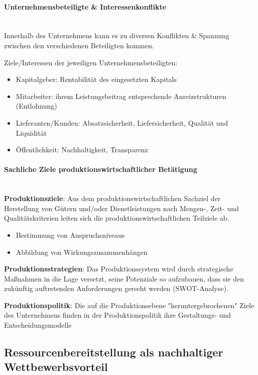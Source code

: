 \documentclass[11pt]{article}
\begin{document}
\paragraph{Unternehmensbeteiligte & Interessenkonflikte}\\
Innerhalb des Unternehmens kann es zu diversen Konflikten \& Spannung zwischen den verschiedenen Beteiligten kommen.

Ziele/Interessen der jeweiligen Unternehmensbeteiligten:
\begin{itemize}
\item Kapitalgeber: Rentabilität des eingesetzten Kapitals
\item Mitarbeiter: ihrem Leistungsbeitrag entsprechende Anreizstrukturen (Entlohnung)
\item Lieferanten/Kunden: Absatzsicherheit, Liefersicherheit, Qualität und Liquidität
\item Öffentlichkeit: Nachhaltigkeit, Transparenz
\end{itemize}

\paragraph{Sachliche Ziele produktionswirtschaftlicher Betätigung}\\

\textbf{\textbf{Produktionsziele}}:
Aus dem produktionswirtschaftlichen Sachziel der Herstellung von Gütern und/oder Dienstleistungen nach Mengen-, Zeit- und Qualitätskriterien leiten sich die
produktionswirtschaftlichen Teilziele ab.
\begin{itemize}
\item Bestimmung von Anspruchsniveaus
\item Abbildung von Wirkungszusammenhängen
\end{itemize}

\textbf{\textbf{Produktionsstrategien}}:
Das Produktionssystem wird durch strategische Maßnahmen in die Lage versetzt, seine Potenziale so aufzubauen, dass sie den zukünftig auftretenden Anforderungen gerecht werden (SWOT-Analyse).

\textbf{\textbf{Produktionspolitik}}:
Die auf die Produktionsebene "heruntergebrochenen" Ziele des Unternehmens finden in der Produktionspolitik ihre Gestaltungs- und Entscheidungsmodelle
\subsection{Ressourcenbereitstellung als nachhaltiger Wettbewerbsvorteil}
\label{sec:org7b1532a}
\end{document}
